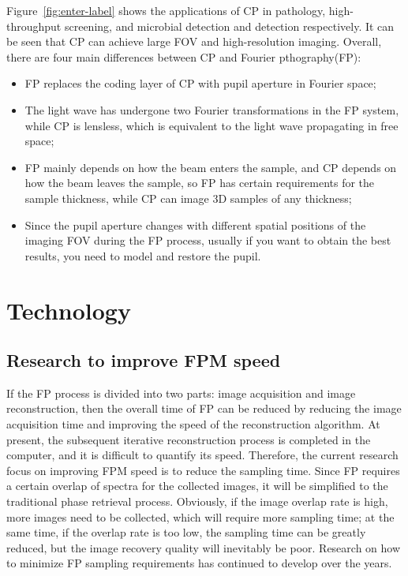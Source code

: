 \documentclass[journal,review,submit,pdftex,moreauthors]{Definitions/mdpi}
\begin{document}
Figure~\ref{fig:enter-label} shows the applications of CP in pathology, high-throughput screening, and microbial detection and detection respectively. It can be seen that CP can achieve large FOV and high-resolution imaging. Overall, there are four main differences between CP and Fourier pthography(FP):


\begin{itemize}
    \item  FP replaces the coding layer of CP with pupil aperture in Fourier space;
    
    \item  The light wave has undergone two Fourier transformations in the FP system, while CP is lensless, which is equivalent to the light wave propagating in free space;
    
    \item FP mainly depends on how the beam enters the sample, and CP depends on how the beam leaves the sample, so FP has certain requirements for the sample thickness, while CP can image 3D samples of any thickness;
    
    \item  Since the pupil aperture changes with different spatial positions of the imaging FOV during the FP process, usually if you want to obtain the best results, you need to model and restore the pupil.
\end{itemize}


\section{Technology}

\subsection{Research to improve FPM speed}
If the FP process is divided into two parts: image acquisition and image reconstruction, then the overall time of FP can be reduced by reducing the image acquisition time and improving the speed of the reconstruction algorithm. At present, the subsequent iterative reconstruction process is completed in the computer, and it is difficult to quantify its speed. Therefore, the current research focus on improving FPM speed is to reduce the sampling time. Since FP requires a certain overlap of spectra for the collected images, it will be simplified to the traditional phase retrieval process. Obviously, if the image overlap rate is high, more images need to be collected, which will require more sampling time; at the same time, if the overlap rate is too low, the sampling time can be greatly reduced, but the image recovery quality will inevitably be poor. Research on how to minimize FP sampling requirements has continued to develop over the years.
\end{document}
